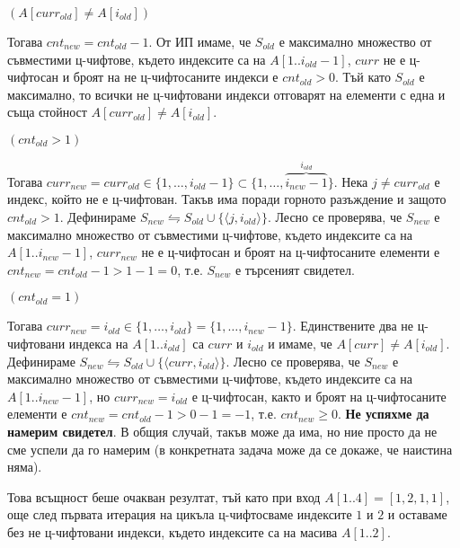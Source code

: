 \begin{solution}
\begin{maintenance}
\begin{mycase}
			\item $(A[curr_{old}]\ne A[i_{old}])$
			
			Тогава $cnt_{new}=cnt_{old}-1$. От ИП имаме, че $S_{old}$ е максимално множество от съвместими ц-чифтове, където индексите са на $A[1..i_{old}-1]$, $curr$ не е ц-чифтосан и броят на не ц-чифтосаните индекси е $cnt_{old}>0$. Тъй като $S_{old}$ е максимално, то всички не ц-чифтовани индекси отговарят на елементи с една и съща стойност $A[curr_{old}]\ne A[i_{old}]$.
			\begin{mycase}
				\item $(cnt_{old}>1)$
				
				\vspace{-0.35cm}
				Тогава $curr_{new}=curr_{old}\in\{1,\dots,i_{old}-1\}\subset\{1,\dots,\overbrace{i_{new}-1}^{i_{old}}\}$. Нека $j\ne curr_{old}$ е индекс, който не е ц-чифтован. Такъв има поради горното разъждение и защото $cnt_{old}>1$. Дефинираме $S_{new}\leftrightharpoons S_{old}\cup\{\langle j,i_{old}\rangle\}$. Лесно се проверява, че $S_{new}$ е максимално множество от съвместими ц-чифтове, където индексите са на $A[1..i_{new}-1]$, $curr_{new}$ не е ц-чифтосан и броят на ц-чифтосаните елементи е $cnt_{new}=cnt_{old}-1>1-1=0$, т.е. $S_{new}$ е търсеният свидетел.
				
				\item $(cnt_{old}=1)$
				
				Тогава $curr_{new}=i_{old}\in\{1,\dots,i_{old}\}=\{1,\dots,i_{new}-1\}$. Единствените два не ц-чифтовани индекса на $A[1..i_{old}]$ са $curr$ и $i_{old}$ и имаме, че $A[curr]\ne A[i_{old}]$. Дефинираме $S_{new}\leftrightharpoons S_{old}\cup\{\langle curr,i_{old}\rangle\}$. Лесно се проверява, че $S_{new}$ е максимално множество от съвместими ц-чифтове, където индексите са на $A[1..i_{new}-1]$, но $curr_{new}=i_{old}$ е ц-чифтосан, както и броят на ц-чифтосаните елементи е $cnt_{new}=cnt_{old}-1>0-1=-1$, т.е. $cnt_{new}\ge0$. \textbf{Не успяхме да намерим свидетел}. В общия случай, такъв може да има, но ние просто да не сме успели да го намерим (в конкретната задача може да се докаже, че наистина няма).
			\end{mycase}
		\end{mycase}
	Това всъщност беше очакван резултат, тъй като при вход $A[1..4]=[1,2,1,1]$, още след първата итерация на цикъла ц-чифтосваме индексите $1$ и $2$ и оставаме без не ц-чифтовани индекси, където индексите са на масива $A[1..2]$.
	\end{maintenance}
\end{solution}